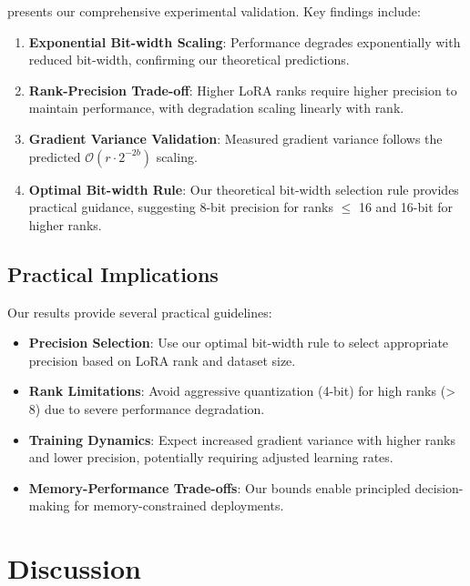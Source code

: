 \documentclass[10pt,twocolumn]{article}
\begin{document}
 presents our comprehensive experimental validation. Key findings include:

\begin{enumerate}
\item \textbf{Exponential Bit-width Scaling}: Performance degrades exponentially with reduced bit-width, confirming our theoretical predictions.

\item \textbf{Rank-Precision Trade-off}: Higher LoRA ranks require higher precision to maintain performance, with degradation scaling linearly with rank.

\item \textbf{Gradient Variance Validation}: Measured gradient variance follows the predicted $\mathcal{O}(r \cdot 2^{-2b})$ scaling.

\item \textbf{Optimal Bit-width Rule}: Our theoretical bit-width selection rule provides practical guidance, suggesting 8-bit precision for ranks $\leq$ 16 and 16-bit for higher ranks.
\end{enumerate}

\subsection{Practical Implications}

Our results provide several practical guidelines:

\begin{itemize}
\item \textbf{Precision Selection}: Use our optimal bit-width rule to select appropriate precision based on LoRA rank and dataset size.

\item \textbf{Rank Limitations}: Avoid aggressive quantization (4-bit) for high ranks (> 8) due to severe performance degradation.

\item \textbf{Training Dynamics}: Expect increased gradient variance with higher ranks and lower precision, potentially requiring adjusted learning rates.

\item \textbf{Memory-Performance Trade-offs}: Our bounds enable principled decision-making for memory-constrained deployments.
\end{itemize}

\section{Discussion}
\end{document}
